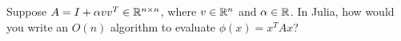 \documentclass[12pt, leqno]{article}
\begin{document}

Suppose $A = I + \alpha v v^T \in \mathbb{R}^{n \times n}$, where $v \in \mathbb{R}^n$ and $\alpha \in \mathbb{R}$.  In Julia, how would you write an $O(n)$ algorithm to evaluate $\phi(x) = x^T A x$?
\end{document}
